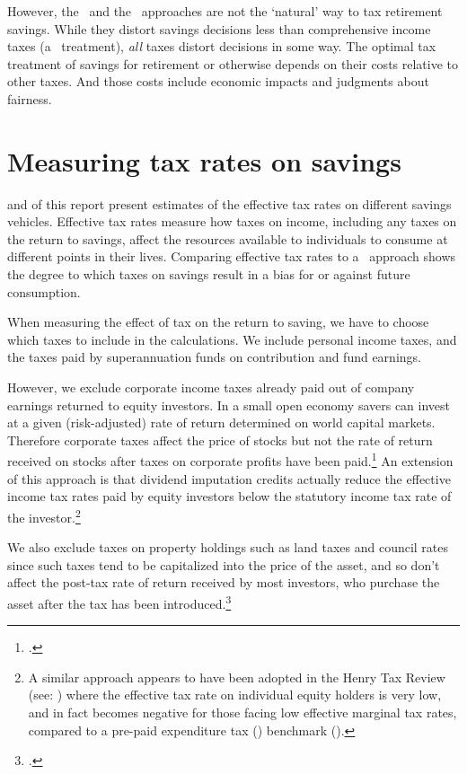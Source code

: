 \begin{subappendices}
However, the \EET\ and the \TEE\ approaches are not the ‘natural’ way to tax retirement savings. While they distort savings decisions less than comprehensive income taxes (a \TTE\ treatment), \emph{all} taxes distort decisions in some way. The optimal tax treatment of savings for retirement or otherwise depends on their costs relative to other taxes. And those costs include economic impacts and judgments about fairness.

\section{Measuring tax rates on savings}\label{appendix:SUPER-C-2}
 and  of this report present estimates of the effective tax rates on different savings vehicles. Effective tax rates measure how taxes on income, including any taxes on the return to savings, affect the resources available to individuals to consume at different points in their lives. Comparing effective tax rates to a \TEE\ approach shows the degree to which taxes on savings result in a bias for or against future consumption.

When measuring the effect of tax on the return to saving, we have to choose which taxes to include in the calculations. We include personal income taxes, and the taxes paid by superannuation funds on contribution and fund earnings. 

However, we exclude corporate income taxes already paid out of company earnings returned to equity investors. In a small open economy savers can invest at a given (risk-adjusted) rate of return determined on world capital markets. Therefore corporate taxes affect the price of stocks but not the rate of return received on stocks after taxes on corporate profits have been paid.\footcite[][7]{Wakefield2009}  An extension of this approach is that dividend imputation credits actually reduce the effective income tax rates paid by equity investors below the statutory income tax rate of the investor.\footnote{A similar approach appears to have been adopted in the Henry Tax Review (see: \textcite[][Figure~A1-19]{HenryTaxReview2010}) where the effective tax rate on individual equity holders is very low, and in fact becomes negative for those facing low effective marginal tax rates, compared to a pre-paid expenditure tax (\TEE) benchmark (\textcite[][67]{HenryTaxReview2010}).}  

We also exclude taxes on property holdings such as land taxes and council rates since such taxes tend to be capitalized into the price of the asset, and so don’t affect the post-tax rate of return received by most investors, who purchase the asset after the tax has been introduced.\footcite{DaleyCoates2015PropertyTaxes}  


\end{subappendices}
